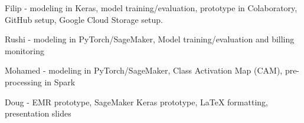 \documentclass{amia}
\begin{document}
Filip - modeling in Keras, model training/evaluation, prototype in Colaboratory, GitHub setup, Google Cloud Storage setup.

Rushi - modeling in PyTorch/SageMaker, Model training/evaluation and billing monitoring

Mohamed - modeling in PyTorch/SageMaker, Class Activation Map (CAM), pre-processing in Spark

Doug - EMR prototype, SageMaker Keras prototype, LaTeX formatting, presentation slides

\makeatletter

\let\oldsection\section
\renewcommand\section{\clearpage\oldsection}


\renewcommand{\@biblabel}[1]{\hfill #1.}
\makeatother
\end{document}
